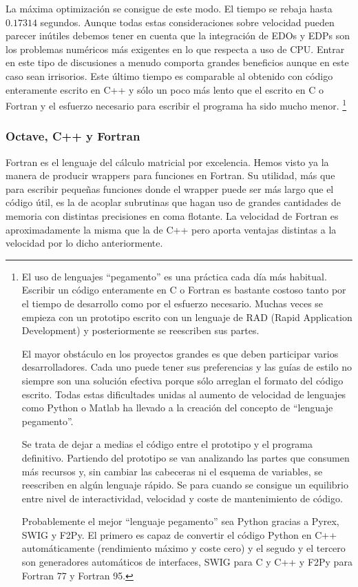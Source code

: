 La máxima optimización se consigue de este modo. El tiempo se rebaja
hasta $0.17314$ segundos. Aunque todas estas consideraciones sobre
velocidad pueden parecer inútiles debemos tener en cuenta que la
integración de EDOs y EDPs son los problemas numéricos más exigentes
en lo que respecta a uso de CPU. Entrar en este tipo de discusiones a
menudo comporta grandes beneficios aunque en este caso sean
irrisorios. Este último tiempo es comparable al obtenido con código
enteramente escrito en C++ y sólo un poco más lento que el escrito en
C o Fortran y el esfuerzo necesario para escribir el programa ha sido
mucho menor.%
\footnote{El uso de lenguajes {}``pegamento'' es una práctica cada día
  más habitual. Escribir un código enteramente en C o Fortran es
  bastante costoso tanto por el tiempo de desarrollo como por el
  esfuerzo necesario.  Muchas veces se empieza con un prototipo
  escrito con un lenguaje de RAD (Rapid Application Development) y
  posteriormente se reescriben sus partes.

  El mayor obstáculo en los proyectos grandes es que deben participar
  varios desarrolladores. Cada uno puede tener sus preferencias y las
  guías de estilo no siempre son una solución efectiva porque sólo
  arreglan el formato del código escrito. Todas estas dificultades
  unidas al aumento de velocidad de lenguajes como Python o Matlab ha
  llevado a la creación del concepto de {}``lenguaje pegamento''.

  Se trata de dejar a medias el código entre el prototipo y el
  programa definitivo. Partiendo del prototipo se van analizando las
  partes que consumen más recursos y, sin cambiar las cabeceras ni el
  esquema de variables, se reescriben en algún lenguaje rápido. Se
  para cuando se consigue un equilibrio entre nivel de interactividad,
  velocidad y coste de mantenimiento de código.

  Probablemente el mejor {}``lenguaje pegamento'' sea Python gracias a
  Pyrex, SWIG y F2Py. El primero es capaz de convertir el código
  Python en C++ automáticamente (rendimiento máximo y coste cero) y el
  segudo y el tercero son generadores automáticos de interfaces, SWIG
  para C y C++ y F2Py para Fortran 77 y Fortran 95.%
}


\subsubsection{Octave, C++ y Fortran}

Fortran es el lenguaje del cálculo matricial por excelencia. Hemos
visto ya la manera de producir wrappers para funciones en Fortran.
Su utilidad, más que para escribir pequeñas funciones donde el wrapper
puede ser más largo que el código útil, es la de acoplar subrutinas
que hagan uso de grandes cantidades de memoria con distintas precisiones
en coma flotante. La velocidad de Fortran es aproximadamente la misma
que la de C++ pero aporta ventajas distintas a la velocidad por lo
dicho anteriormente.


